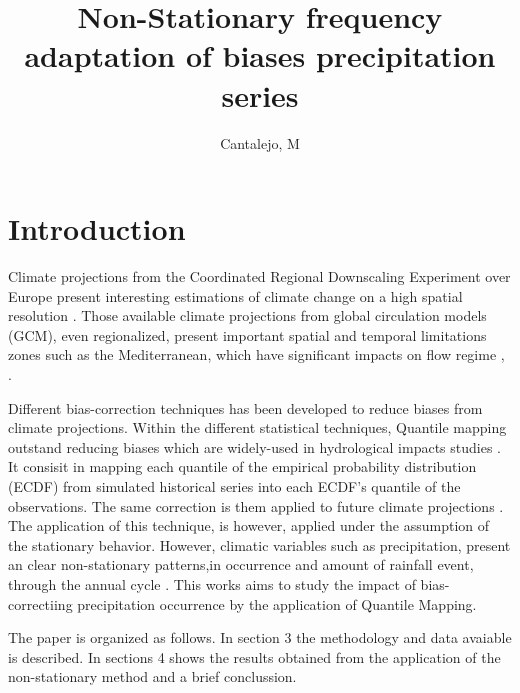 \documentclass[a4paper,11pt]{article}
\begin{document}
\title{Non-Stationary frequency adaptation of biases precipitation series}
\author{Cantalejo, M}
\maketitle
{}



\section{Introduction}\label{sec1}
Climate projections from the Coordinated Regional Downscaling Experiment over Europe present interesting estimations of climate change on a high spatial resolution \cite{bib1}. Those available climate projections  from global circulation models (GCM), even regionalized, present important spatial and temporal limitations zones such as the Mediterranean, which have significant impacts on flow regime \cite{bib2} , \cite{bib3}.

Different bias-correction techniques has been developed to reduce biases from climate projections. Within the different statistical techniques, Quantile mapping outstand reducing biases which are widely-used in hydrological impacts studies \cite{bib4}. It consisit in mapping each quantile of the empirical probability distribution (ECDF) from simulated historical series into each ECDF's quantile of the observations. The same correction is them applied to future climate projections \cite{bib5}. The application of this technique, is however, applied under the assumption of the stationary behavior. However, climatic variables such as precipitation, present an clear non-stationary patterns,in occurrence and amount of rainfall event, through the annual cycle \cite{bib6}. This works aims to study the impact of bias-correctiing precipitation occurrence by the application of Quantile Mapping. 

The paper is organized as follows. In section 3 the methodology and data avaiable is described. In sections 4 shows the results obtained from the application of the non-stationary method and a brief conclussion.  
\end{document}
